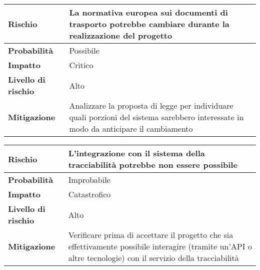 \begin{table}[H]
  \begin{tabularx}{\textwidth}{lX}
    \toprule
    \textbf{Rischio}            & \textbf{La normativa europea sui documenti di trasporto potrebbe cambiare durante la realizzazione del progetto}                      \\
    \midrule
    \textbf{Probabilità}        & Possibile                                                                                                                             \\
    \textbf{Impatto}            & Critico                                                                                                                               \\
    \textbf{Livello di rischio} & Alto                                                                                                                                  \\
    \textbf{Mitigazione}        & Analizzare la proposta di legge per individuare quali porzioni del sistema sarebbero interessate in modo da anticipare il cambiamento \\
    \bottomrule
  \end{tabularx}
\end{table}

\begin{table}[H]
  \begin{tabularx}{\textwidth}{lX}
    \toprule
    \textbf{Rischio}            & \textbf{L'integrazione con il sistema della tracciabilità potrebbe non essere possibile}                                                                      \\
    \midrule
    \textbf{Probabilità}        & Improbabile                                                                                                                                                   \\
    \textbf{Impatto}            & Catastrofico                                                                                                                                                  \\
    \textbf{Livello di rischio} & Alto                                                                                                                                                          \\
    \textbf{Mitigazione}        & Verificare prima di accettare il progetto che sia effettivamente possibile interagire (tramite un'API o altre tecnologie) con il servizio della tracciabilità \\
    \bottomrule
  \end{tabularx}
\end{table}

